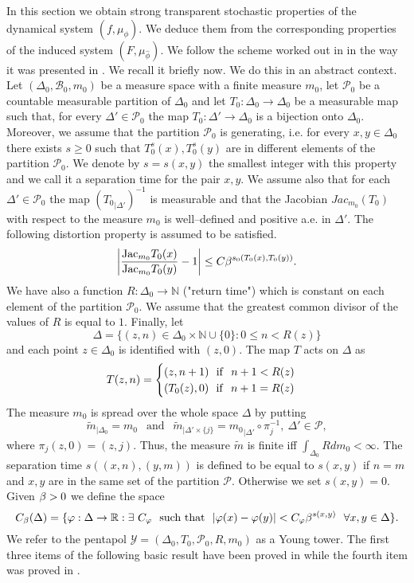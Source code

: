 \documentclass[12pt]{amsart}
\numberwithin{equation}{section}
\def\De{\Delta}               \def\e{\varepsilon}          \def\f{\phi}
\begin{document}
\fr In this section we obtain strong transparent stochastic properties of the
dynamical system $(f,\mu_{\phi})$. We deduce them from the
corresponding properties of the induced system
$(F,\mu_{\hat\phi})$. We follow the scheme worked out in 
\cite{lsy} in the way it was presented in \cite{SUZ1}. We recall it briefly
now. We do this in an abstract 
context. Let $(\Delta_0,\mathcal{B}_0,m_0)$ be a
measure space with a finite measure $m_0$, let $\mathcal{P}_0$ be a
countable measurable  
partition of $\De_0$ and let $T_0:\Delta_0\to \Delta_0$ be a
 measurable map such that, for every 
  $\Delta'\in\mathcal{P}_0$ the map $T_0:\Delta'\to \Delta_0$ is a
  bijection onto $\Delta_0$. Moreover, we assume that   the partition
  $\mathcal{P}_0$ is generating, i.e. for every $x,y\in\Delta_0$ there
  exists $s\ge 0$ such that $T_0^s(x), T_0^s(y)$ are in different
  elements of the partition $\mathcal{P}_0$. We denote by $s=s(x,y)$
the smallest integer with this property and we
call it a separation time for the pair $x,y$.
We assume also  that for each $\Delta'\in\mathcal{P}_0$ the map
$({T_0}_{|\Delta'})^{-1}$ is measurable and that the Jacobian  
$Jac_{m_0}(T_0)$ with respect to the measure $m_0$ is well--defined and
positive a.e. in $\Delta'$. The 
following distortion property is assumed to be satisfied. 
\begin{equation}\label{youngcond0}
\left |\frac{\text{{\rm Jac}}_{m_0} T_0(x)}{\text{{\rm Jac}}_{m_0} T_0(y)}-1\right |
\le C\beta^{s_0(T_0(x),T_0(y))}.
\end{equation}
We have also a function $R:\Delta_0\to\mathbb{N}$ ("return time")
which is constant on each element of the partition  
$\mathcal{P}_0$.
We assume that the greatest common divisor of the values of $R$ is
equal to $1$. Finally, let 
$$
\Delta=\{(z,n)\in\Delta_0\times\mathbb{N}\cup\{0\}:0\le n<R(z)\}
$$
and each point $z\in\Delta_0$ is identified with $(z,0)$. The map $T$
acts on $\Delta$ as 
$$
T(z,n)=
\begin{cases}
(z, n+1)~~{\rm if}~~ n+1<R(z)\\
(T_0(z),0)~~{\rm if}~~ n+1=R(z)
\end{cases}
$$
The measure $m_0$ is spread over the whole space $\Delta$ by putting
$$
\tilde m_{|\Delta_0}=m_0 
\  \  \text{ and }  \  \
\tilde m_{|\Delta'\times\{j\}}
={m_0}_{|\Delta'}\circ\pi^{-1}_j, \  \De'\in \mathcal{P},
$$
where $\pi_j(z,0)=(z,j)$. Thus, the measure $\tilde m$ is finite iff
$\int_{\Delta_0}Rdm_0<\infty$. 
The separation time $s((x,n),(y,m))$ is defined to be equal to $s(x,y)$
if $n=m$ and $x,y$ are in the same set of the partition
$\mathcal{P}$. Otherwise we set $s(x,y)=0$. Given $\beta>0$ we define
the space
$$
C_\beta(\De)=\{\varphi:\Delta\to \mathbb{R}:\exists \ C_\varphi~~{\rm such~
  that}~~|\varphi(x)-\varphi(y)|
<C_\varphi\beta^{s(x,y)}~~\forall x,y\in\Delta\}.
$$
We refer to the pentapol $\mathcal{Y}=(\De_0,T_0,\mathcal{P}_0,R,m_0)$
as a Young 
tower. The first three items of the following basic result have been
proved in \cite{lsy} while the fourth item was proved in \cite{SUZ1}.  
\end{document}
